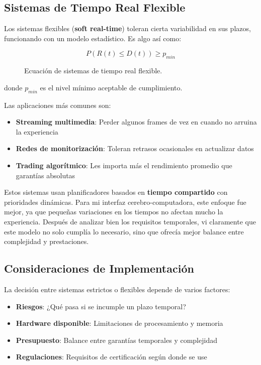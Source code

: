     \newpage
    \subsection{Sistemas de Tiempo Real Flexible}
        Los sistemas flexibles (\textbf{soft real-time}) toleran cierta variabilidad en sus plazos, funcionando con un modelo estadístico. Es algo así como:

        \begin{figure}[h!]
            \centering
            \begin{equation}
                P(R(t) \leq D(t)) \geq p_{min}
            \end{equation}            \caption{Ecuación de sistemas de tiempo real flexible.}
            \label{fig:soft_real_time_equation}
        \end{figure}

        donde $p_{min}$ es el nivel mínimo aceptable de cumplimiento.

        Las aplicaciones más comunes son:
        \begin{itemize}
            \item \textbf{Streaming multimedia}: Perder algunos frames de vez en cuando no arruina la experiencia
            \item \textbf{Redes de monitorización}: Toleran retrasos ocasionales en actualizar datos
            \item \textbf{Trading algorítmico}: Les importa más el rendimiento promedio que garantías absolutas
        \end{itemize}

        Estos sistemas usan planificadores basados en \textbf{tiempo compartido} con prioridades dinámicas. Para mi interfaz cerebro-computadora, este enfoque fue mejor, ya que pequeñas variaciones en los tiempos no afectan mucho la experiencia. Después de analizar bien los requisitos temporales, vi claramente que este modelo no solo cumplía lo necesario, sino que ofrecía mejor balance entre complejidad y prestaciones.

    \subsection{Consideraciones de Implementación}
        La decisión entre sistemas estrictos o flexibles depende de varios factores:
        \begin{itemize}
            \item \textbf{Riesgos}: ¿Qué pasa si se incumple un plazo temporal?
            \item \textbf{Hardware disponible}: Limitaciones de procesamiento y memoria
            \item \textbf{Presupuesto}: Balance entre garantías temporales y complejidad
            \item \textbf{Regulaciones}: Requisitos de certificación según donde se use
        \end{itemize}

